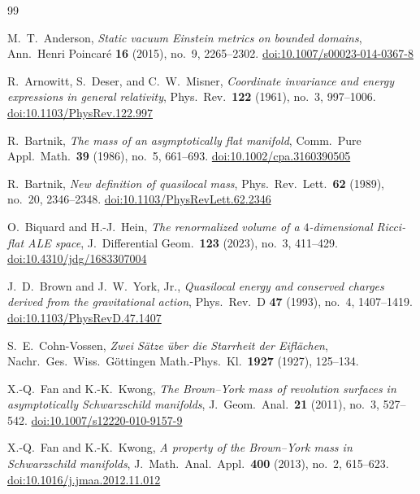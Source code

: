 \documentclass[10pt]{amsart}
\theoremstyle{plain}
\theoremstyle{remark}
\begin{document}
	
	
	\begin{thebibliography}{99}
		
		M.~T.~Anderson,
		\emph{Static vacuum Einstein metrics on bounded domains},
		Ann.\ Henri Poincar\'e \textbf{16} (2015), no.~9, 2265--2302.
		\href{https://doi.org/10.1007/s00023-014-0367-8}{doi:10.1007/s00023-014-0367-8}
		
		R.~Arnowitt, S.~Deser, and C.~W.~Misner,
		\emph{Coordinate invariance and energy expressions in general relativity},
		Phys.\ Rev.\ \textbf{122} (1961), no.~3, 997--1006.
		\href{https://doi.org/10.1103/PhysRev.122.997}{doi:10.1103/PhysRev.122.997}
		
		R.~Bartnik,
		\emph{The mass of an asymptotically flat manifold},
		Comm.\ Pure Appl.\ Math.\ \textbf{39} (1986), no.~5, 661--693.
		\href{https://doi.org/10.1002/cpa.3160390505}{doi:10.1002/cpa.3160390505}
		
		R.~Bartnik,
		\emph{New definition of quasilocal mass},
		Phys.\ Rev.\ Lett.\ \textbf{62} (1989), no.~20, 2346--2348.
		\href{https://doi.org/10.1103/PhysRevLett.62.2346}{doi:10.1103/PhysRevLett.62.2346}
		
		O.~Biquard and H.-J.~Hein,
		\emph{The renormalized volume of a $4$-dimensional Ricci-flat ALE space},
		J.\ Differential Geom.\ \textbf{123} (2023), no.~3, 411--429.
		\href{https://doi.org/10.4310/jdg/1683307004}{doi:10.4310/jdg/1683307004}
		
		J.~D.~Brown and J.~W.~York, Jr.,
		\emph{Quasilocal energy and conserved charges derived from the gravitational action},
		Phys.\ Rev.\ D \textbf{47} (1993), no.~4, 1407--1419.
		\href{https://doi.org/10.1103/PhysRevD.47.1407}{doi:10.1103/PhysRevD.47.1407}
		
		S.~E.~Cohn-Vossen,
		\emph{Zwei S\"atze \"uber die Starrheit der Eifl\"achen},
		Nachr.\ Ges.\ Wiss.\ G\"ottingen Math.-Phys.\ Kl.\ \textbf{1927} (1927), 125--134.
		
		X.-Q.~Fan and K.-K.~Kwong,
		\emph{The Brown--York mass of revolution surfaces in asymptotically Schwarzschild manifolds},
		J.\ Geom.\ Anal.\ \textbf{21} (2011), no.~3, 527--542.
		\href{https://doi.org/10.1007/s12220-010-9157-9}{doi:10.1007/s12220-010-9157-9}
		
		X.-Q.~Fan and K.-K.~Kwong,
		\emph{A property of the Brown--York mass in Schwarzschild manifolds},
		J.\ Math.\ Anal.\ Appl.\ \textbf{400} (2013), no.~2, 615--623.
		\href{https://doi.org/10.1016/j.jmaa.2012.11.012}{doi:10.1016/j.jmaa.2012.11.012}
		

\end{thebibliography}
\end{document}
